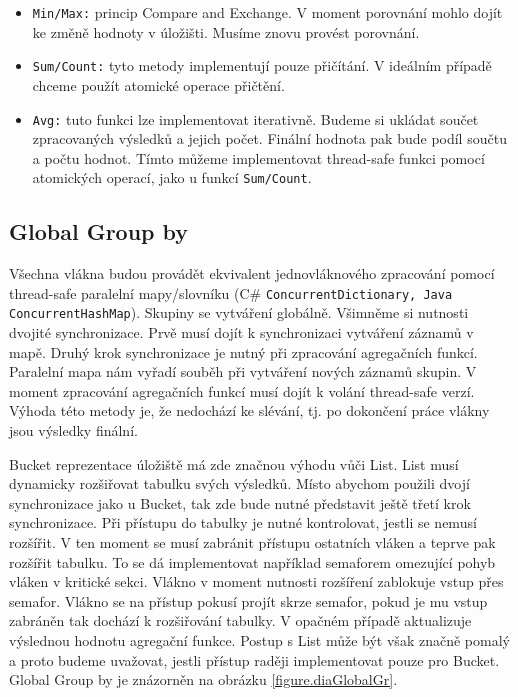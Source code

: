 \begin{itemize}

\item \texttt{Min/Max:} princip Compare and Exchange. V moment porovnání mohlo dojít ke změně hodnoty v úložišti.
Musíme znovu provést porovnání.  

\item \texttt{Sum/Count:} tyto metody implementují pouze přičítání. 
V ideálním případě chceme použít atomické operace přičtění.
 
\item \texttt{Avg:} tuto funkci lze implementovat iterativně. 
Budeme si ukládat součet zpracovaných výsledků a jejich počet.
Finální hodnota pak bude podíl součtu a počtu hodnot.
Tímto můžeme implementovat thread-safe funkci pomocí atomických operací, jako u funkcí \texttt{Sum/Count}.
\end{itemize}

\subsection{Global Group by} \label{anal.groupby.global}

Všechna vlákna budou provádět ekvivalent jednovláknového zpracování pomocí thread-safe paralelní mapy/slovníku (C\# \texttt{ConcurrentDictionary, Java \texttt{ConcurrentHashMap}}).
Skupiny se vytváření globálně.
Všimněme si nutnosti dvojité synchronizace.
Prvě musí dojít k synchronizaci vytváření záznamů v mapě.
Druhý krok synchronizace je nutný při zpracování agregačních funkcí.
Paralelní mapa nám vyřadí souběh při vytváření nových záznamů skupin.
V moment zpracování agregačních funkcí musí dojít k volání thread-safe verzí.
Výhoda této metody je, že nedochází ke slévání, tj. po dokončení práce vlákny jsou výsledky finální.

Bucket reprezentace úložiště má zde značnou výhodu vůči List.
List musí dynamicky rozšiřovat tabulku svých výsledků.
Místo abychom použili dvojí synchronizace jako u Bucket, tak zde bude nutné představit ještě třetí krok synchronizace.
Při přístupu do tabulky je nutné kontrolovat, jestli se nemusí rozšířit.
V ten moment se musí zabránit přístupu ostatních vláken a teprve pak rozšířit tabulku.
To se dá implementovat například semaforem omezující pohyb vláken v kritické sekci.
Vlákno v moment nutnosti rozšíření zablokuje vstup přes semafor.
Vlákno se na přístup pokusí projít skrze semafor, pokud je mu vstup zabráněn tak dochází k rozšiřování tabulky.
V opačném případě aktualizuje výslednou hodnotu agregační funkce.
Postup s List může být však značně pomalý a proto budeme uvažovat, jestli přístup raději implementovat pouze pro Bucket.
Global Group by je znázorněn na obrázku \ref{figure.diaGlobalGr}.


